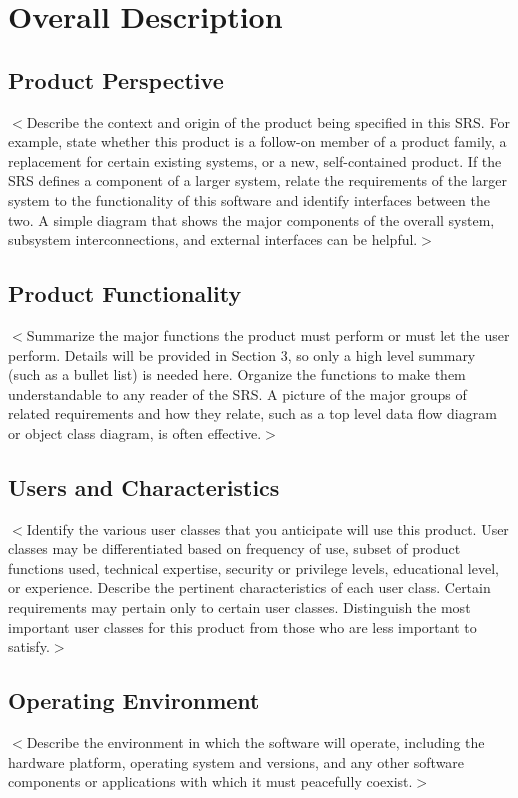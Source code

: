 \documentclass[16pt]{scrreprt}
\begin{document}
\chapter{Overall Description}
\label{Overall Description}

\section{Product Perspective}
$<$Describe the context and origin of the product being specified in this SRS.  
For example, state whether this product is a follow-on member of a product 
family, a replacement for certain existing systems, or a new, self-contained 
product. If the SRS defines a component of a larger system, relate the 
requirements of the larger system to the functionality of this software and 
identify interfaces between the two. A simple diagram that shows the major 
components of the overall system, subsystem interconnections, and external 
interfaces can be helpful.$>$

\section{Product Functionality}
$<$Summarize the major functions the product must perform or must let the user 
perform. Details will be provided in Section 3, so only a high level summary 
(such as a bullet list) is needed here. Organize the functions to make them 
understandable to any reader of the SRS. A picture of the major groups of 
related requirements and how they relate, such as a top level data flow diagram 
or object class diagram, is often effective.$>$

\section{Users and Characteristics}
$<$Identify the various user classes that you anticipate will use this product.  
User classes may be differentiated based on frequency of use, subset of product 
functions used, technical expertise, security or privilege levels, educational 
level, or experience. Describe the pertinent characteristics of each user class.  
Certain requirements may pertain only to certain user classes. Distinguish the 
most important user classes for this product from those who are less important 
to satisfy.$>$

\section{Operating Environment}
$<$Describe the environment in which the software will operate, including the 
hardware platform, operating system and versions, and any other software 
components or applications with which it must peacefully coexist.$>$
\end{document}
